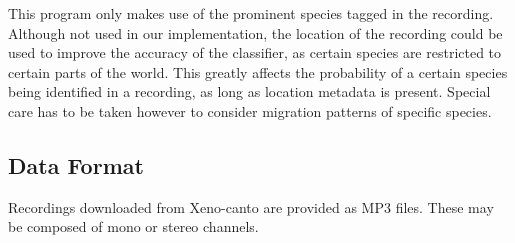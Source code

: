 This program only makes use of the prominent species tagged in the recording.
Although not used in our implementation, the location of the recording could be
used to improve the accuracy of the classifier, as certain species are restricted
to certain parts of the world.
This greatly affects the probability of a certain species being identified in
a recording, as long as location metadata is present.
Special care has to be taken however to consider migration patterns of specific
species.

\subsection{Data Format}
Recordings downloaded from Xeno-canto are provided as MP3 files.
These may be composed of mono or stereo channels.
